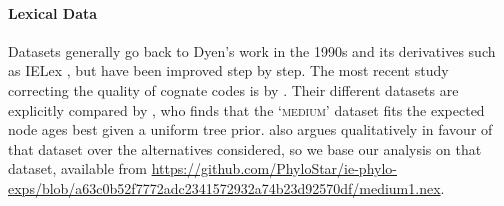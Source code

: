 \documentclass[]{rsos}%
\begin{document}
\paragraph{Lexical Data}
Datasets generally go back to Dyen's work \parencite{dyen1992indoeuropean,dyen1997comparative} in the 1990s and its derivatives such as IELex \parencite{ielex},
but have been improved
step by step. The most recent study correcting
the quality of cognate codes is by \textcite{chang2015ancestryconstrained}. Their different datasets are explicitly compared by \textcite{rama2018three}, who finds that the
‘\textsc{medium}’ dataset fits the expected node ages best given a uniform tree prior.  also argues qualitatively in favour of
that dataset over the alternatives considered, so we base our analysis on that dataset, available from
\url{https://github.com/PhyloStar/ie-phylo-exps/blob/a63c0b52f7772adc2341572932a74b23d92570df/medium1.nex}.
\end{document}
